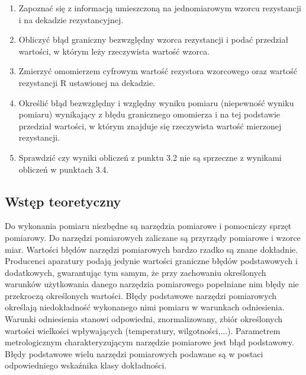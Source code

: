 \documentclass{article}  %
\begin{document}
\begin{enumerate}
\begin{enumerate}
                \item Zapoznać się z informacją umieszczoną na jednomiarowym wzorcu rezystancji i na dekadzie rezystancyjnej.
                \item Obliczyć błąd graniczny bezwzględny wzorca rezystancji i podać przedział wartości, w którym leży rzeczywista wartość wzorca.
                \item Zmierzyć omomierzem cyfrowym wartość rezystora wzorcowego oraz wartość rezystancji R ustawionej na dekadzie. 
                \item Określić błąd bezwzględny i względny wyniku pomiaru (niepewność  wyniku pomiaru) wynikający z błędu granicznego omomierza i 
                na tej podstawie przedział wartości, w którym znajduje się rzeczywista wartość mierzonej rezystancji. 
                \item Sprawdzić czy wyniki obliczeń z punktu 3.2 nie są sprzeczne z wynikami obliczeń w punktach 3.4.
            \end{enumerate}
    \end{enumerate}
\subsection{Wstęp teoretyczny}
\begin{flushleft}
    Do wykonania pomiaru niezbędne są narzędzia pomiarowe i pomocniczy sprzęt pomiarowy. 
    Do narzędzi pomiarowych zaliczane są przyrządy pomiarowe i wzorce miar. 
    Wartości błędów narzędzi pomiarowych bardzo rzadko są znane dokładnie. 
    Producenci aparatury podają jedynie wartości graniczne błędów podstawowych i dodatkowych, 
    gwarantując tym samym, że przy zachowaniu określonych warunków użytkowania danego narzędzia pomiarowego popełniane nim błędy nie przekroczą określonych wartości. 
    Błędy podstawowe narzędzi pomiarowych określają niedokładność wykonanego nimi pomiaru w warunkach odniesienia. 
    Warunki odniesienia stanowi odpowiedni, znormalizowany, zbiór określonych wartości wielkości wpływających (temperatury, wilgotności,...).
    Parametrem metrologicznym charakteryzującym narzędzie pomiarowe jest błąd podstawowy. 
    Błędy podstawowe wielu narzędzi pomiarowych podawane są w postaci odpowiedniego wskaźnika klasy dokładności.
\end{flushleft}
\end{document}

